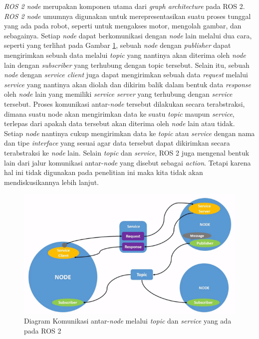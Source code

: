 \textit{ROS 2 node} merupakan komponen utama dari \textit{graph architecture} pada ROS 2. \textit{ROS 2 node} umumnya digunakan untuk
merepresentasikan suatu proses tunggal yang ada pada robot, seperti untuk mengakses motor, mengolah gambar, dan sebagainya.
Setiap \textit{node} dapat berkomunikasi dengan \textit{node} lain melalui dua cara, seperti yang terlihat pada Gambar \ref{fig:ros2node}, sebuah \textit{node} dengan \textit{publisher} dapat mengirimkan sebuah data melalui
\textit{topic} yang nantinya akan diterima oleh \textit{node} lain dengan \textit{subscriber} yang terhubung dengan topic tersebut. Selain itu, sebuah \textit{node}
dengan \textit{service client} juga dapat mengirimkan sebuah data \textit{request} melalui \textit{service} yang nantinya akan diolah dan dikirim balik dalam
bentuk data \textit{response} oleh \textit{node} lain yang memiliki \textit{service server} yang terhubung dengan \textit{service} tersebut.
Proses komunikasi antar-\textit{node} tersebut dilakukan secara terabstraksi, dimana suatu node akan mengirimkan data ke suatu \textit{topic} maupun \textit{service}, terlepas dari apakah data tersebut
akan diterima oleh \textit{node} lain atau tidak. Setiap \textit{node} nantinya cukup mengirimkan data ke \textit{topic} atau \textit{service} dengan nama dan tipe
\textit{interface} yang sesuai agar data tersebut dapat dikirimkan secara terabstraksi ke \textit{node} lain.
Selain \textit{topic} dan \textit{service}, ROS 2 juga mengenal bentuk lain dari jalur komunikasi antar-\textit{node} yang disebut sebagai \textit{action}. Tetapi karena hal ini tidak digunakan pada penelitian ini maka kita tidak akan mendiskusikannya lebih lanjut. 
\begin{figure}[ht]
  \centering
  \includegraphics[scale=0.9]{gambar/ros2_node.png}
  \caption{Diagram Komunikasi antar-\textit{node} melalui \textit{topic} dan \textit{service} yang ada pada ROS 2}
  \label{fig:ros2node}
\end{figure}

